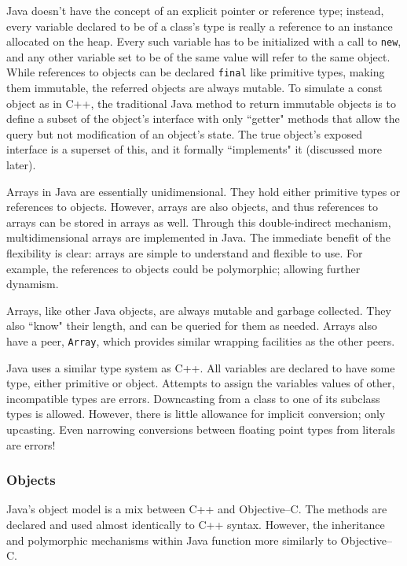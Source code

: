 Java doesn't have the concept of an explicit pointer or reference type;
instead, every variable declared to be of a class's type is really a reference
to an instance allocated on the heap. Every such variable has to be
initialized with a call to \texttt{new}, and any other variable set to be of
the same value will refer to the same object. While references to objects can
be declared \texttt{final} like primitive types, making them immutable, the
referred objects are always mutable. To simulate a const object as in C++, the
traditional Java method to return immutable objects is to define a subset of
the object's interface with only ``getter" methods that allow the query but
not modification of an object's state. The true object's exposed interface is
a superset of this, and it formally ``implements" it (discussed more later).

Arrays in Java are essentially unidimensional. They hold either primitive
types or references to objects. However, arrays are also objects, and thus
references to arrays can be stored in arrays as well. Through this
double-indirect mechanism, multidimensional arrays are implemented in Java.
The immediate benefit of the flexibility is clear: arrays are simple to
understand and flexible to use. For example, the references to objects could
be polymorphic; allowing further dynamism.

Arrays, like other Java objects, are always mutable and garbage collected.
They also ``know" their length, and can be queried for them as needed. Arrays
also have a peer, \texttt{Array}, which provides similar wrapping facilities
as the other peers.

Java uses a similar type system as C++. All variables are declared to have
some type, either primitive or object. Attempts to assign the variables values
of other, incompatible types are errors. Downcasting from a class to one of
its subclass types is allowed. However, there is little allowance for implicit
conversion; only upcasting. Even narrowing conversions between floating point
types from literals are errors!

\subsubsection{Objects}

Java's object model is a mix between C++ and Objective--C. The methods are
declared and used almost identically to C++ syntax. However, the inheritance
and polymorphic mechanisms within Java function more similarly to
Objective--C.


